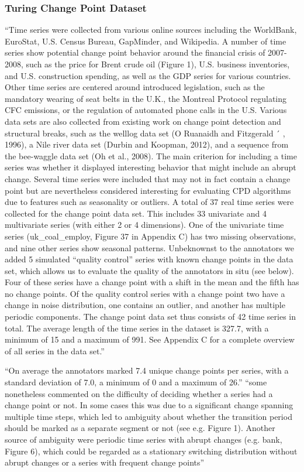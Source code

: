 \subsubsection{Turing Change Point Dataset}
``Time series were collected from various online sources including the WorldBank, EuroStat, U.S.
Census Bureau, GapMinder, and Wikipedia. A number of time series show potential change
point behavior around the financial crisis of 2007-2008, such as the price for Brent crude oil
(Figure 1), U.S. business inventories, and U.S. construction spending, as well as the GDP
series for various countries. Other time series are centered around introduced legislation, such
as the mandatory wearing of seat belts in the U.K., the Montreal Protocol regulating CFC
emissions, or the regulation of automated phone calls in the U.S. Various data sets are also
collected from existing work on change point detection and structural breaks, such as the welllog data set (O Ruanaidh and Fitzgerald ´ , 1996), a Nile river data set (Durbin and Koopman,
2012), and a sequence from the bee-waggle data set (Oh et al., 2008). The main criterion for
including a time series was whether it displayed interesting behavior that might include an
abrupt change. Several time series were included that may not in fact contain a change point
but are nevertheless considered interesting for evaluating CPD algorithms due to features such
as seasonality or outliers.
A total of 37 real time series were collected for the change point data set. This includes 33
univariate and 4 multivariate series (with either 2 or 4 dimensions). One of the univariate time
series (uk_coal_employ, Figure 37 in Appendix C) has two missing observations, and nine other
series show seasonal patterns. Unbeknownst to the annotators we added 5 simulated “quality
control” series with known change points in the data set, which allows us to evaluate the quality
of the annotators in situ (see below). Four of these series have a change point with a shift in the
mean and the fifth has no change points. Of the quality control series with a change point two
have a change in noise distribution, one contains an outlier, and another has multiple periodic
components. The change point data set thus consists of 42 time series in total. The average
length of the time series in the dataset is 327.7, with a minimum of 15 and a maximum of 991.
See Appendix C for a complete overview of all series in the data set.''

``On average the annotators marked 7.4 unique change points per series, with a standard deviation of 7.0, a minimum of 0 and a maximum of 26.''
``some nonetheless commented on the difficulty of deciding whether a series had a
change point or not. In some cases this was due to a significant change spanning multiple
time steps, which led to ambiguity about whether the transition period should be marked as
a separate segment or not (see e.g. Figure 1). Another source of ambiguity were periodic
time series with abrupt changes (e.g. bank, Figure 6), which could be regarded as a stationary
switching distribution without abrupt changes or a series with frequent change points''

